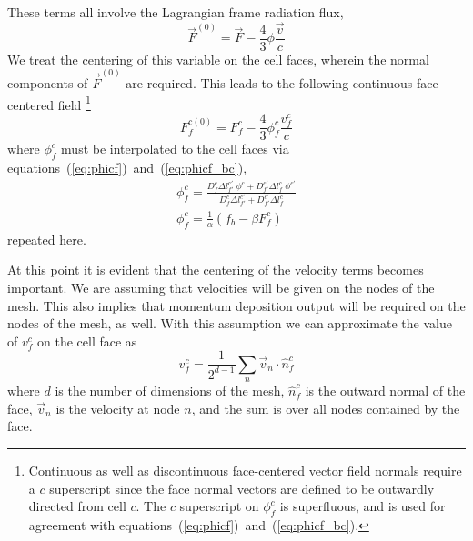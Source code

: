 \documentclass{article}
\newcommand{\bfunc}{\ensuremath{f_{b}}}
\begin{document}
These terms all involve the Lagrangian frame radiation flux,
\begin{equation}
        \vec{F}^{(0)} = \vec{F} - \frac{4}{3} \phi \frac{\vec{v}}{c}
\end{equation}
We treat the centering of this variable on the cell faces, wherein the normal
components of $\vec{F}^{(0)}$ are required.
This leads to the following continuous face-centered field%
\footnote{%
   Continuous as well as discontinuous
   face-centered vector field normals require a $c$ superscript
   since the face normal vectors are defined to be outwardly directed from
   cell $c$.
   The $c$ superscript on $\phi^{c}_{f}$ is superfluous, and is used
   for agreement with equations~(\ref{eq:phicf})~and~(\ref{eq:phicf_bc}).
}
\begin{equation}
  \boxed{
        F^{c(0)}_{f} = F^{c}_{f} - \frac{4}{3} \phi^{c}_{f} \frac{v^{c}_{f}}{c}
  }
\end{equation}
where $\phi^{c}_{f}$ must be interpolated to the cell faces
via equations~(\ref{eq:phicf})~and~(\ref{eq:phicf_bc}),
\begin{gather}
   \boxed{
        \phi^{c}_{f} =  \frac
                        { D^{c}_{f} \Delta l^{c'}_{f'} \; \phi^{c} 
                            + D^{c'}_{f'} \Delta l^{c}_{f} \; \phi^{c'} 
                        }
                        { D^{c}_{f} \Delta l^{c'}_{f'}
                            + D^{c'}_{f'} \Delta l^{c}_{f}
                        }
   } \\
   \boxed{
        \phi^{c}_{f} = \frac{1}{\alpha} \left( \bfunc - \beta F^{c}_{f} \right)
   }
\end{gather}
repeated here.

At this point it is evident that the centering of the velocity terms
becomes important.
We are assuming that velocities will be given on the nodes of the mesh.
This also implies that momentum deposition output will be required on
the nodes of the mesh, as well.
With this assumption we can approximate the value of $v^{c}_{f}$
on the cell face as
\begin{equation}
  \boxed{
     v^{c}_{f} = \frac{1}{2^{d-1}} \sum_{n} \vec{v}_{n} \cdot \hat{n}^{c}_{f}
  }
\end{equation}
where $d$ is the number of dimensions of the mesh,
$\hat{n}^{c}_{f}$ is the outward normal of the face,
$\vec{v}_{n}$ is the velocity at node $n$,
and the sum is over all nodes contained by the face.
\end{document}
